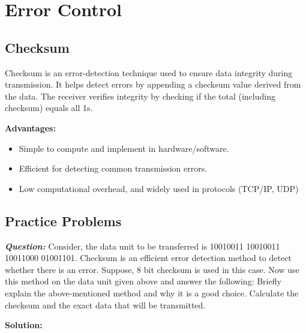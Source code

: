 \chapter{Error Control}

\section{Checksum}

Checksum is an error-detection technique used to ensure data integrity during transmission. It helps detect errors by appending a checksum value derived from the data. The receiver verifies integrity by checking if the total (including checksum) equals all 1s.

\vspace{1em}
\textbf{Advantages:}
\begin{itemize}[parsep=0.25em]
   \item Simple to compute and implement in hardware/software.
   \item Efficient for detecting common transmission errors.
   \item Low computational overhead, and widely used in protocols (TCP/IP, UDP)
\end{itemize}

\section{Practice Problems}
\textbf{\textit{Question:}}
Consider, the data unit to be transferred is 10010011 10010011 10011000 01001101. Checksum is an efficient error detection method to detect whether there is an error. Suppose, 8 bit checksum is used in this case. Now use this method on the data unit given above and answer the following:
Briefly explain the above-mentioned method and why it is a good choice.
Calculate the checksum and the exact data that will be transmitted.

\textbf{Solution:}

